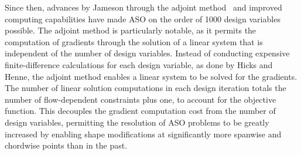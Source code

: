 Since then, advances by Jameson through the adjoint method~\cite{jameson_aerodynamic_1988, jameson_computational_1989} and improved computing capabilities have made ASO on the order of 1000 design variables possible. 
The adjoint method is particularly notable, as it permits the computation of gradients through the solution of a linear system that is independent of the number of design variables. Instead of conducting expensive finite-difference calculations for each design variable, as done by Hicks and Henne, the adjoint method enables a linear system to be solved for the gradients. The number of linear solution computations in each design iteration totals the number of flow-dependent constraints plus one, to account for the objective function. 
This decouples the gradient computation cost from the number of design variables, permitting the resolution of ASO problems to be greatly increased by enabling shape modifications at significantly more spanwise and chordwise points than in the past.


